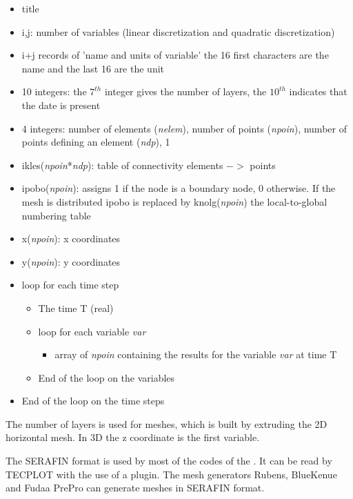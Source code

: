 \begin{itemize}
\setlength{\itemsep}{1pt}
\setlength{\parskip}{0pt}
\setlength{\parsep}{0pt}
\item title
\item i,j: number of variables (linear discretization and quadratic
discretization)
\item i+j records of 'name and units of variable' the 16 first characters are
the name and the last 16 are the unit
\item 10 integers: the $7^{th}$ integer gives the number of layers, the
$10^{th}$ indicates that the date is present
\item 4 integers: number of elements (\textit{nelem}), number of points
(\textit{npoin}), number of points defining an element (\textit{ndp}), 1
\item ikles(\textit{npoin}*\textit{ndp}): table of connectivity elements $->$
points
\item ipobo(\textit{npoin}): assigns 1 if the node is a boundary node, 0
otherwise.  If the mesh is distributed ipobo is replaced by
knolg(\textit{npoin}) the local-to-global numbering table
\item x(\textit{npoin}): x coordinates
\item y(\textit{npoin}): y coordinates
\item loop for each time step
\begin{itemize}
\setlength{\itemsep}{1pt}
\setlength{\parskip}{0pt}
\setlength{\parsep}{0pt}
\item The time T (real)
\item loop for each variable \textit{var}
\begin{itemize}
\setlength{\itemsep}{1pt}
\setlength{\parskip}{0pt}
\setlength{\parsep}{0pt}
\item array of \textit{npoin} containing the results for the variable
\textit{var} at time T
\end{itemize}
\item End of the loop on the variables
\end{itemize}
\item End of the loop on the time steps
\end{itemize}

The number of layers is used for  meshes, which is built by extruding the
2D horizontal mesh.  In 3D the z coordinate is the first variable.

The SERAFIN format is used by most of the codes of the \telemacsystem. It can be read
by TECPLOT with the use of a plugin.  The mesh generators Rubens, BlueKenue
and Fudaa PrePro can generate meshes in SERAFIN format.


